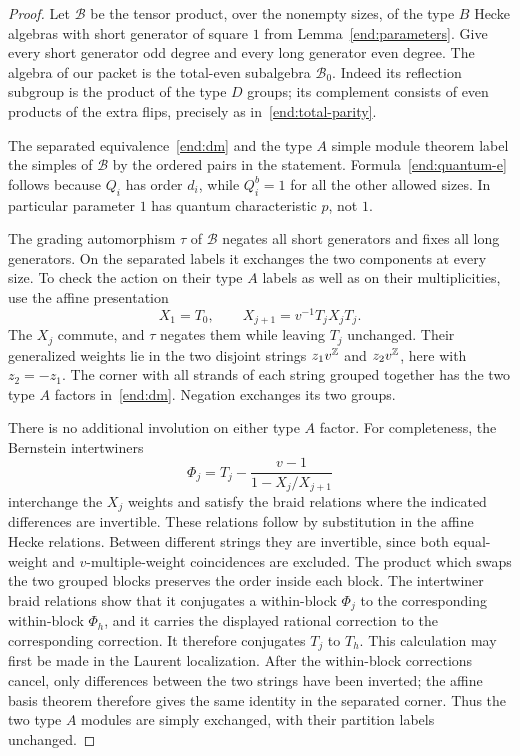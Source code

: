 \begin{proof}
Let $\mathcal B$ be the tensor product, over the nonempty sizes,
of the type $B$ Hecke algebras with short generator of square
$1$ from Lemma~\ref{end:parameters}.  Give every short generator
odd degree and every long generator even degree.  The algebra
of our packet is the total-even subalgebra $\mathcal B_0$.
Indeed its reflection subgroup is the product of the type $D$
groups; its complement consists of even products of the extra
flips, precisely as in~\eqref{end:total-parity}.

The separated equivalence~\eqref{end:dm} and the type $A$ simple
module theorem label the simples of $\mathcal B$ by the ordered
pairs in the statement.  Formula~\eqref{end:quantum-e} follows
because $Q_i$ has order $d_i$, while $Q_i^b=1$ for all the other
allowed sizes.  In particular parameter $1$ has quantum
characteristic $p$, not $1$.

The grading automorphism $\tau$ of $\mathcal B$ negates all
short generators and fixes all long generators.  On the
separated labels it exchanges the two components at every
size.  To check the action on their type $A$ labels as well as
on their multiplicities, use the affine presentation
\[
 X_1=T_0,\qquad X_{j+1}=v^{-1}T_jX_jT_j.
\]
The $X_j$ commute, and $\tau$ negates them while leaving $T_j$
unchanged.  Their generalized weights lie in the two disjoint
strings $z_1v^{\mathbb Z}$ and $z_2v^{\mathbb Z}$, here with $z_2=-z_1$.
The corner with all strands of each string grouped together
has the two type $A$ factors in~\eqref{end:dm}.  Negation
exchanges its two groups.

There is no additional involution on either type $A$ factor.
For completeness, the Bernstein intertwiners
\[
 \Phi_j=T_j-\frac{v-1}{1-X_j/X_{j+1}}
\]
interchange the $X_j$ weights and satisfy the braid relations
where the indicated differences are invertible.  These
relations follow by substitution in the affine Hecke
relations.  Between different strings they are invertible,
since both equal-weight and $v$-multiple-weight coincidences
are excluded.  The product which swaps the two grouped blocks
preserves the order inside each block.  The intertwiner braid
relations show that it conjugates a within-block $\Phi_j$ to
the corresponding within-block $\Phi_h$, and it carries the
displayed rational correction to the corresponding correction.
It therefore conjugates $T_j$ to $T_h$.  This calculation may
first be made in the Laurent localization.  After the
within-block corrections cancel, only differences between the
two strings have been inverted; the affine basis theorem
therefore gives the same identity in the separated corner.
Thus the two type $A$ modules are simply exchanged, with their
partition labels unchanged.


\end{proof}

